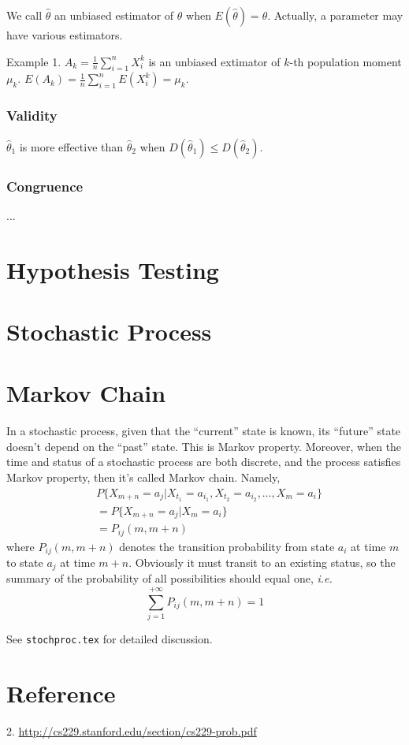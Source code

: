We call $\hat{\theta}$ an unbiased estimator of $\theta$ when
$E(\hat{\theta}) = \theta$. Actually, a parameter may have various estimators.

Example 1. $A_k = \frac{1}{n} \sum_{i=1}^n X_i^k$ is an unbiased extimator
of $k$-th population moment $\mu_k$.
$E(A_k) = \frac{1}{n} \sum_{i=1}^n E(X_i^k) = \mu_k$.

\subsubsection{Validity}

$\hat{\theta}_1$ is more effective than $\hat{\theta}_2$ when
$D(\hat{\theta}_1) \leqslant D(\hat{\theta}_2)$.

\subsubsection{Congruence}

...

\section{Hypothesis Testing}

\section{Stochastic Process}

\section{Markov Chain}

In a stochastic process, given that the ``current'' state is known,
its ``future'' state doesn't depend on the ``past'' state. This is
Markov property. Moreover, when the time and status of a stochastic
process are both discrete, and the process satisfies Markov property,
then it's called Markov chain. Namely,
\begin{align*}
     & P\{ X_{m+n}=a_j | X_{t_1}=a_{i_1}, X_{t_2}=a_{i_2}, \ldots, X_{m}=a_{i} \} \\
	 &= P\{ X_{m+n}=a_j | X_{m}=a_{i} \}\\
	 &= P_{ij}(m,m+n)
\end{align*}
where $P_{ij}(m,m+n)$ denotes the transition probability from state
$a_i$ at time $m$ to state $a_j$ at time $m+n$. Obviously it must
transit to an existing status, so the summary of the probability of
all possibilities should equal one, {\it i.e.}
$$ \sum\limits_{j=1}^{+\infty} P_{ij}(m,m+n) = 1 $$

See \verb|stochproc.tex| for detailed discussion.

\section{Reference}


2. \url{http://cs229.stanford.edu/section/cs229-prob.pdf}
